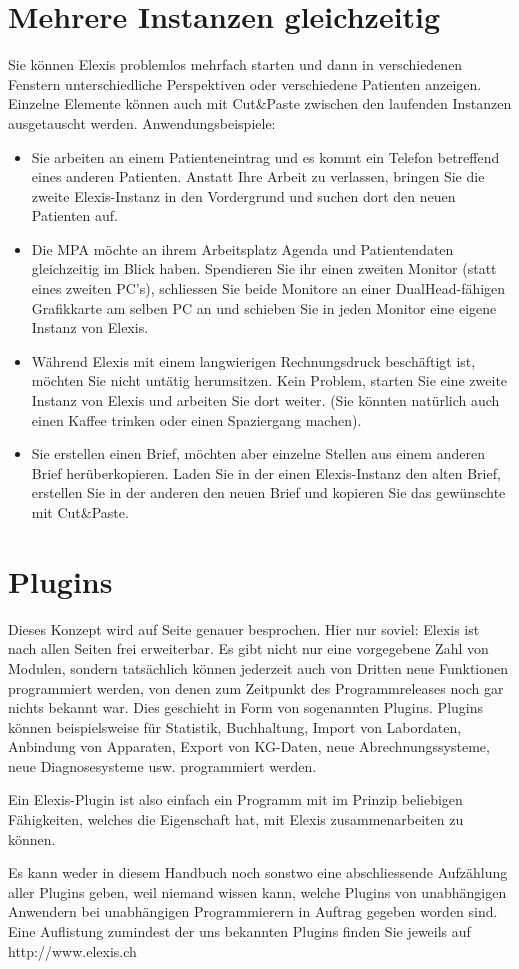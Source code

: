  \section{Mehrere Instanzen gleichzeitig}
 Sie können Elexis problemlos mehrfach starten und dann in verschiedenen
 Fenstern unterschiedliche Perspektiven oder verschiedene Patienten anzeigen.
 Einzelne Elemente können auch mit Cut\&Paste zwischen den laufenden Instanzen
 ausgetauscht werden.
 Anwendungsbeispiele:
 \begin{itemize}
   \item Sie arbeiten an einem Patienteneintrag und es kommt ein Telefon
   betreffend eines anderen Patienten. Anstatt Ihre Arbeit zu verlassen, bringen
   Sie die zweite Elexis-Instanz in den Vordergrund und suchen dort den neuen
   Patienten auf.
   \item Die MPA möchte an ihrem Arbeitsplatz Agenda und Patientendaten
   gleichzeitig im Blick haben. Spendieren Sie ihr einen zweiten Monitor (statt
   eines zweiten PC's), schliessen Sie beide Monitore an einer DualHead-fähigen
   Grafikkarte am selben PC an und schieben Sie in jeden Monitor eine eigene
   Instanz von Elexis.
   \item Während Elexis mit einem langwierigen Rechnungsdruck beschäftigt ist,
   möch\-ten Sie nicht untätig herumsitzen. Kein Problem, starten Sie eine zweite
   Instanz von Elexis und arbeiten Sie dort weiter. (Sie könnten natürlich auch
   einen Kaffee trinken oder einen Spaziergang machen).
   \item Sie erstellen einen Brief, möchten aber einzelne Stellen aus einem
   anderen Brief herüberkopieren. Laden Sie in der einen Elexis-Instanz den
   alten Brief, erstellen Sie in der anderen den neuen Brief und kopieren Sie
   das gewünschte mit Cut\&Paste.
 \end{itemize}

\section{Plugins}
Dieses Konzept wird auf Seite \pageref{expl:plugins} genauer besprochen. Hier nur soviel: Elexis ist nach allen Seiten frei erweiterbar. Es gibt nicht nur eine vorgegebene Zahl von \glqq Modulen\grqq{}, sondern tatsächlich können jederzeit auch von Dritten neue Funktionen programmiert werden, von denen zum Zeitpunkt des Programmreleases noch gar nichts bekannt war. Dies geschieht in Form von sogenannten \glqq Plugins\grqq{}. Plugins können beispielsweise für Statistik, Buchhaltung, Import von Labordaten, Anbindung von Apparaten, Export von KG-Daten, neue Abrechnungssysteme, neue Diagnosesysteme usw. programmiert werden.

Ein Elexis-Plugin ist also einfach ein Programm mit im Prinzip beliebigen Fähigkeiten, welches die Eigenschaft hat, mit Elexis zusammenarbeiten zu können.

Es kann weder in diesem Handbuch noch sonstwo eine abschliessende Aufzählung aller Plugins geben, weil niemand wissen kann, welche Plugins von unabhängigen Anwendern bei unabhängigen Programmierern in Auftrag gegeben worden sind.  Eine Auflistung zumindest der uns bekannten Plugins finden Sie jeweils auf http://www.elexis.ch
 
 